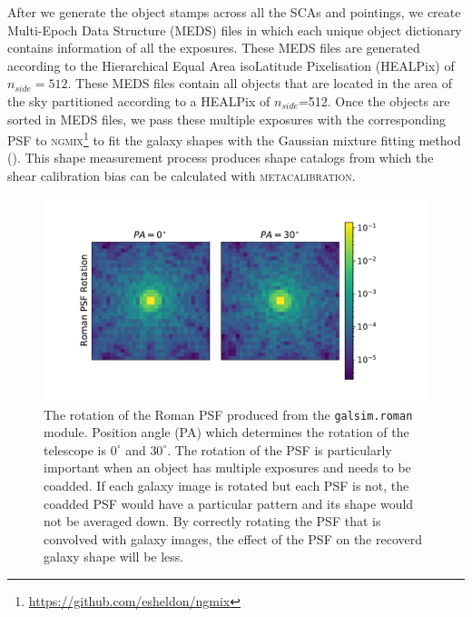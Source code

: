 \documentclass[fleqn,usenatbib]{mnras}
\begin{document}
After we generate the object stamps across all the SCAs and pointings, we create Multi-Epoch Data Structure (MEDS) files in which each unique object dictionary contains information of all the exposures. These MEDS files are generated according to the Hierarchical Equal Area isoLatitude Pixelisation (HEALPix) of $n_{side}=512$. These MEDS files contain all objects that are located in the area of the sky partitioned according to a HEALPix of $n_{side}$=512. Once the objects are sorted in MEDS files, we pass these multiple exposures with the corresponding PSF to \textsc{ngmix}\footnote{\url{ https://github.com/esheldon/ngmix}} to fit the galaxy shapes with the Gaussian mixture fitting method (\citealt{2014MNRAS.444L..25S}). This shape measurement process produces shape catalogs from which the shear calibration bias can be calculated with \textsc{metacalibration}.

\begin{figure}
	\includegraphics[width=\columnwidth]{figure1.pdf}
	\vspace*{-3mm}
    \caption{The rotation of the Roman PSF produced from the \texttt{galsim.roman} module. Position angle (PA) which determines the rotation of the telescope is $0^{\circ}$ and $30^{\circ}$. The rotation of the PSF is particularly important when an object has multiple exposures and needs to be coadded. If each galaxy image is rotated but each PSF is not, the coadded PSF would have a particular pattern and its shape would not be averaged down. By correctly rotating the PSF that is convolved with galaxy images, the effect of the PSF on the recoverd galaxy shape will be less.}
    \label{fig:psfrot}
\end{figure}
\end{document}
